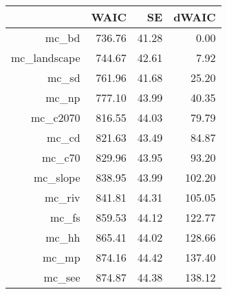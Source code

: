 \begin{table}[ht]
\centering
\begin{tabular}{rrrr}
  \hline
 & WAIC & SE & dWAIC \\ 
  \hline
mc\_bd & 736.76 & 41.28 & 0.00 \\ 
  mc\_landscape & 744.67 & 42.61 & 7.92 \\ 
  mc\_sd & 761.96 & 41.68 & 25.20 \\ 
  mc\_np & 777.10 & 43.99 & 40.35 \\ 
  mc\_c2070 & 816.55 & 44.03 & 79.79 \\ 
  mc\_cd & 821.63 & 43.49 & 84.87 \\ 
  mc\_c70 & 829.96 & 43.95 & 93.20 \\ 
  mc\_slope & 838.95 & 43.99 & 102.20 \\ 
  mc\_riv & 841.81 & 44.31 & 105.05 \\ 
  mc\_fs & 859.53 & 44.12 & 122.77 \\ 
  mc\_hh & 865.41 & 44.02 & 128.66 \\ 
  mc\_mp & 874.16 & 44.42 & 137.40 \\ 
  mc\_see & 874.87 & 44.38 & 138.12 \\ 
   \hline
\end{tabular}
\end{table}
